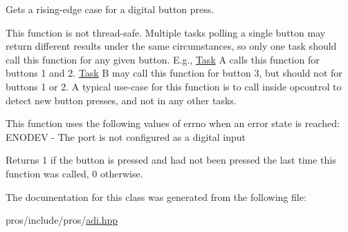 Gets a rising-\/edge case for a digital button press. 

This function is not thread-\/safe. Multiple tasks polling a single button may return different results under the same circumstances, so only one task should call this function for any given button. E.\+g., \hyperlink{classpros_1_1Task}{Task} A calls this function for buttons 1 and 2. \hyperlink{classpros_1_1Task}{Task} B may call this function for button 3, but should not for buttons 1 or 2. A typical use-\/case for this function is to call inside opcontrol to detect new button presses, and not in any other tasks.

This function uses the following values of errno when an error state is reached\+: E\+N\+O\+D\+EV -\/ The port is not configured as a digital input

\begin{DoxyReturn}{Returns}
1 if the button is pressed and had not been pressed the last time this function was called, 0 otherwise. 
\end{DoxyReturn}


The documentation for this class was generated from the following file\+:\begin{DoxyCompactItemize}
\item 
pros/include/pros/\hyperlink{adi_8hpp}{adi.\+hpp}\end{DoxyCompactItemize}

